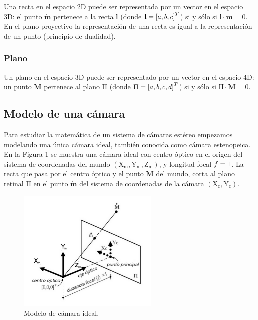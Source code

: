 \documentclass[11pt,a4paper,titlepage]{article}
\newcommand{\Scalar}[1]{\ensuremath{\mathnormal{#1}}}
\newcommand{\Two}[1]{\ensuremath{\mathbf{#1}}}
\newcommand{\Three}[1]{\ensuremath{\mathbf{#1}}}
\newcommand{\TwoCart}[1]{\ensuremath{\mathbf{\dot{#1}}}}
\newcommand{\ThreeCart}[1]{\ensuremath{\mathbf{\dot{#1}}}}
\newcommand{\Vector}[1]{\ensuremath{\left[#1\right]^T}}
\newcommand{\Axis}[1]{\ensuremath{\mathrm{#1}}}
\newcommand{\Plane}[1]{\ensuremath{\mathrm{#1}}}
\newcommand{\Figure}[1]{Figura #1}
\begin{document}
Una recta en el espacio 2D puede ser representada por un vector en el espacio 3D: el punto \TwoCart{m} pertenece a la recta \Two{l} (donde $\Two{l} = \Vector{\Scalar{a}, \Scalar{b}, \Scalar{c}}$) si y sólo si $\Two{l} \cdot \Two{m} = 0$. En el plano proyectivo la representación de una recta es igual a la representación de un punto (principio de dualidad).

\subsubsection{Plano}

Un plano en el espacio 3D puede ser representado por un vector en el espacio 4D: un punto \ThreeCart{M} pertenece al plano \Plane{\Pi} (donde $\Plane{\Pi} = \Vector{\Scalar{a}, \Scalar{b}, \Scalar{c}, \Scalar{d}}$) si y sólo si $\Plane{\Pi} \cdot \Three{M} = 0$.

\subsection{Modelo de una cámara}

Para estudiar la matemática de un sistema de cámaras estéreo empezamos modelando una única cámara ideal, también conocida como cámara estenopeica. En la \Figure{1} se muestra una cámara ideal con centro óptico en el origen del sistema de coordenadas del mundo $\left( \Axis{X_m}, \Axis{Y_m}, \Axis{Z_m} \right)$, y longitud focal $\Scalar{f} = 1$. La recta que pasa por el centro óptico y el punto \ThreeCart{M} del mundo, corta al plano retinal \Plane{\Pi} en el punto \TwoCart{m} del sistema de coordenadas de la cámara $\left( \Axis{X_c}, \Axis{Y_c} \right)$.


\begin{figure}[h!]

  \centering
    \includegraphics[width=0.6\textwidth]{f1.png}
  \caption{Modelo de cámara ideal.}
\end{figure}
\end{document}
